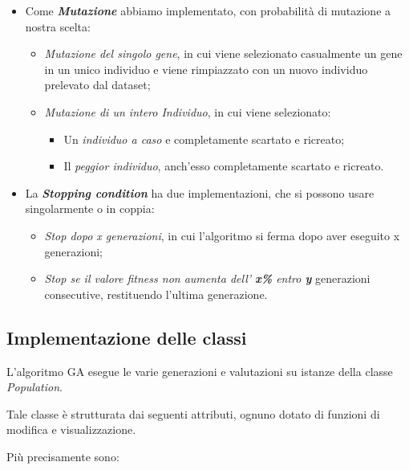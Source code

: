 \documentclass{article}
\begin{document}
\begin{itemize}
\item Come \textit{\textbf{Mutazione}} abbiamo implementato, con probabilità di mutazione a nostra scelta:
\begin{itemize}
\item \textit{Mutazione del singolo gene}, in cui viene selezionato casualmente un gene in un unico individuo e viene rimpiazzato con un nuovo individuo prelevato dal dataset;
\item \textit{Mutazione di un intero Individuo}, in cui viene selezionato:
    \begin{itemize}
        \item Un \textit{individuo a caso} e completamente scartato e ricreato;
        \item Il \textit{peggior individuo}, anch'esso completamente scartato e ricreato.
    \end{itemize}
\end{itemize}

\item La \textit{\textbf{Stopping condition}} ha due implementazioni, che si possono usare singolarmente o in coppia:
\begin{itemize}
    \item \textit{Stop dopo x generazioni}, in cui l'algoritmo si ferma dopo aver eseguito x generazioni;
    \item \textit{Stop se il valore fitness non aumenta dell' \textbf{x\%} entro \textbf{y}} generazioni consecutive, restituendo l'ultima generazione.
\end{itemize}
\end{itemize}

\bigskip

\subsection{Implementazione delle classi}

L'algoritmo GA esegue le varie generazioni e valutazioni su istanze della classe \textit{Population}.

Tale classe è strutturata dai seguenti attributi, ognuno dotato di funzioni di modifica e visualizzazione.

Più precisamente sono:
\end{document}
